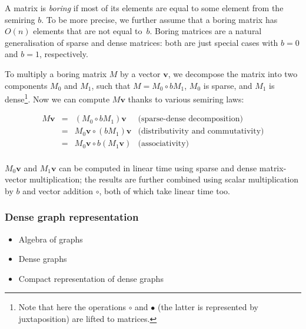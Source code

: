\documentclass[11pt,letterpaper]{article}
\begin{document}
A matrix is \emph{boring} if most of its elements are equal to some element from
the semiring $b$. To be more precise, we further assume that a boring matrix has
$O(n)$ elements that are not equal to~$b$. Boring matrices are a natural
generalisation of sparse and dense matrices: both are just special cases with
$b=0$ and $b=1$, respectively.

To multiply a boring matrix $M$ by a vector $\mathbf{v}$, we decompose the
matrix into two components $M_0$ and $M_1$, such that $M = M_0 \circ b M_1$,
$M_0$ is sparse, and $M_1$ is dense\footnote{Note that here the operations
$\circ$ and $\bullet$ (the latter is represented by juxtaposition) are lifted to
matrices.}. Now we can compute $M \mathbf{v}$ thanks to various semiring laws:

\[
\begin{array}{rcll}
M \mathbf{v} & = & (M_0 \circ b M_1) \mathbf{v} & \text{(sparse-dense decomposition)}\\
 & = & M_0 \mathbf{v} \circ (b M_1) \mathbf{v} & \text{(distributivity and commutativity)}\\
 & = & M_0 \mathbf{v} \circ b (M_1 \mathbf{v}) & \text{(associativity)}\\
\end{array}
\]


\noindent
$M_0 \mathbf{v}$ and $M_1 \mathbf{v}$ can be computed in linear time using
sparse and dense matrix-vector multiplication; the results are further combined
using scalar multiplication by $b$ and vector addition $\circ$, both of which
take linear time too.



\subsubsection{Dense graph representation}\label{sec-dense-graph}

\begin{itemize}
  \item Algebra of graphs
  \item Dense graphs
  \item Compact representation of dense graphs
\end{itemize}
\end{document}
